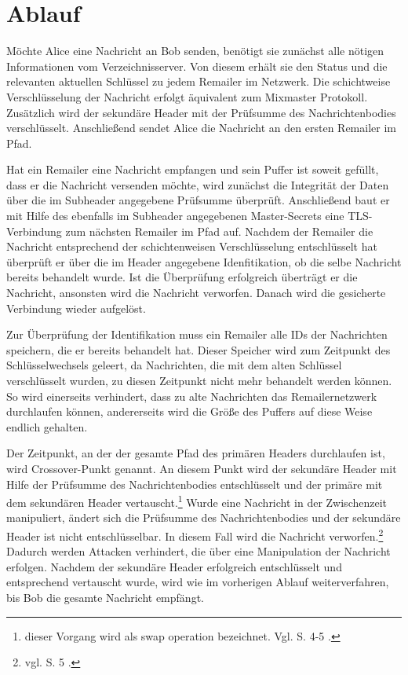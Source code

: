 \section{Ablauf}
Möchte Alice eine Nachricht an Bob senden, benötigt sie zunächst alle nötigen Informationen vom Verzeichnisserver. Von diesem erhält sie den Status und die relevanten aktuellen Schlüssel zu jedem Remailer im Netzwerk. Die schichtweise Verschlüsselung der Nachricht erfolgt äquivalent zum Mixmaster Protokoll. Zusätzlich wird der sekundäre Header mit der Prüfsumme des Nachrichtenbodies verschlüsselt.
Anschließend sendet Alice die Nachricht an den ersten Remailer im Pfad.

Hat ein Remailer eine Nachricht empfangen und sein Puffer ist soweit gefüllt, dass er die Nachricht versenden möchte, wird zunächst die Integrität der Daten über die im Subheader angegebene Prüfsumme überprüft. Anschließend baut er mit Hilfe des ebenfalls im Subheader angegebenen Master-Secrets eine TLS-Verbindung zum nächsten Remailer im Pfad auf. Nachdem der Remailer die Nachricht entsprechend der schichtenweisen Verschlüsselung entschlüsselt hat überprüft er über die im Header angegebene Idenfitikation, ob die selbe Nachricht bereits behandelt wurde. Ist die Überprüfung erfolgreich überträgt er die Nachricht, ansonsten wird die Nachricht verworfen. Danach wird die gesicherte Verbindung wieder aufgelöst.

Zur Überprüfung der Identifikation muss ein Remailer alle IDs der Nachrichten speichern, die er bereits behandelt hat. Dieser Speicher wird zum Zeitpunkt des Schlüsselwechsels geleert, da Nachrichten, die mit dem alten Schlüssel verschlüsselt wurden, zu diesen Zeitpunkt nicht mehr behandelt werden können. So wird einerseits verhindert, dass zu alte Nachrichten das Remailernetzwerk durchlaufen können, andererseits wird die Größe des Puffers auf diese Weise endlich gehalten.

Der Zeitpunkt, an der der gesamte Pfad des primären Headers durchlaufen ist, wird \glqq Crossover\grqq -Punkt genannt. An diesem Punkt wird der sekundäre Header mit Hilfe der Prüfsumme des Nachrichtenbodies entschlüsselt und der primäre mit dem sekundären Header vertauscht.\footnote{dieser Vorgang wird als swap operation bezeichnet. Vgl. S. 4-5 \cite{mixminion}.} Wurde eine Nachricht in der Zwischenzeit manipuliert, ändert sich die Prüfsumme des Nachrichtenbodies und der sekundäre Header ist nicht entschlüsselbar. In diesem Fall wird die Nachricht verworfen.\footnote{vgl. S. 5 \cite{mixminion}.} Dadurch werden Attacken verhindert, die über eine Manipulation der Nachricht erfolgen. Nachdem der sekundäre Header erfolgreich entschlüsselt und entsprechend vertauscht wurde, wird wie im vorherigen Ablauf weiterverfahren, bis Bob die gesamte Nachricht empfängt. 

